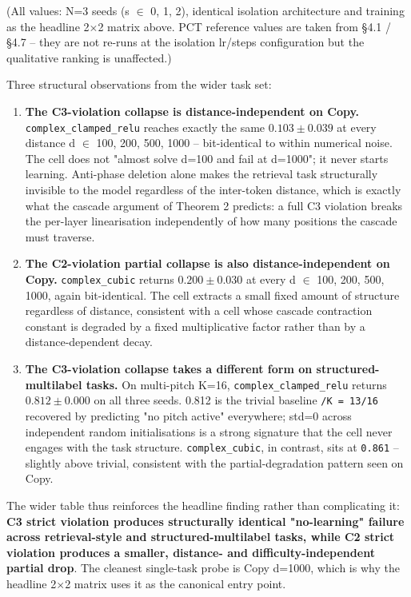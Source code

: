\documentclass[11pt,a4paper]{article}
\theoremstyle{plain}
\theoremstyle{definition}
\begin{document}
(All values: N=3 seeds (s $\in$ {0, 1, 2}), identical isolation architecture and training as the headline 2$\times$2 matrix above. PCT reference values are taken from \S{}4.1 / \S{}4.7 -- they are not re-runs at the isolation lr/steps configuration but the qualitative ranking is unaffected.)

Three structural observations from the wider task set:

\begin{enumerate}
  \item \textbf{The C3-violation collapse is distance-independent on Copy.} \texttt{complex\_clamped\_relu} reaches exactly the same $0.103 \pm  0.039$ at every distance d $\in$ {100, 200, 500, 1000} -- bit-identical to within numerical noise. The cell does not "almost solve d=100 and fail at d=1000"; it never starts learning. Anti-phase deletion alone makes the retrieval task structurally invisible to the model regardless of the inter-token distance, which is exactly what the cascade argument of Theorem 2 predicts: a full C3 violation breaks the per-layer linearisation independently of how many positions the cascade must traverse.
  \item \textbf{The C2-violation partial collapse is also distance-independent on Copy.} \texttt{complex\_cubic} returns $0.200 \pm  0.030$ at every d $\in$ {100, 200, 500, 1000}, again bit-identical. The cell extracts a small fixed amount of structure regardless of distance, consistent with a cell whose cascade contraction constant is degraded by a fixed multiplicative factor rather than by a distance-dependent decay.
  \item \textbf{The C3-violation collapse takes a different form on structured-multilabel tasks.} On multi-pitch K=16, \texttt{complex\_clamped\_relu} returns $0.812 \pm  0.000$ on all three seeds. 0.812 is the trivial baseline \texttt{/K = 13/16} recovered by predicting "no pitch active" everywhere; std=0 across independent random initialisations is a strong signature that the cell never engages with the task structure. \texttt{complex\_cubic}, in contrast, sits at \texttt{0.861} -- slightly above trivial, consistent with the partial-degradation pattern seen on Copy.
\end{enumerate}

The wider table thus reinforces the headline finding rather than complicating it: \textbf{C3 strict violation produces structurally identical "no-learning" failure across retrieval-style and structured-multilabel tasks, while C2 strict violation produces a smaller, distance- and difficulty-independent partial drop}. The cleanest single-task probe is Copy d=1000, which is why the headline 2$\times$2 matrix uses it as the canonical entry point.
\end{document}

